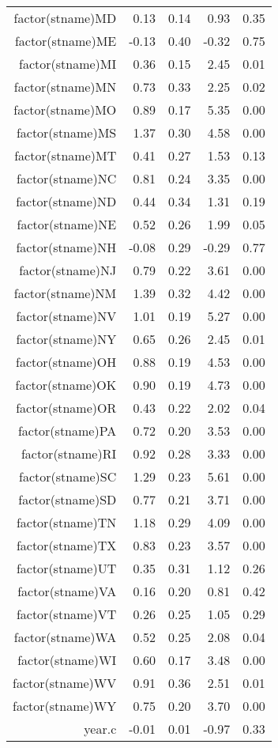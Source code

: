 \begin{table}[ht]
\begin{tabular}{rrrrr}
  factor(stname)MD & 0.13 & 0.14 & 0.93 & 0.35 \\ 
  factor(stname)ME & -0.13 & 0.40 & -0.32 & 0.75 \\ 
  factor(stname)MI & 0.36 & 0.15 & 2.45 & 0.01 \\ 
  factor(stname)MN & 0.73 & 0.33 & 2.25 & 0.02 \\ 
  factor(stname)MO & 0.89 & 0.17 & 5.35 & 0.00 \\ 
  factor(stname)MS & 1.37 & 0.30 & 4.58 & 0.00 \\ 
  factor(stname)MT & 0.41 & 0.27 & 1.53 & 0.13 \\ 
  factor(stname)NC & 0.81 & 0.24 & 3.35 & 0.00 \\ 
  factor(stname)ND & 0.44 & 0.34 & 1.31 & 0.19 \\ 
  factor(stname)NE & 0.52 & 0.26 & 1.99 & 0.05 \\ 
  factor(stname)NH & -0.08 & 0.29 & -0.29 & 0.77 \\ 
  factor(stname)NJ & 0.79 & 0.22 & 3.61 & 0.00 \\ 
  factor(stname)NM & 1.39 & 0.32 & 4.42 & 0.00 \\ 
  factor(stname)NV & 1.01 & 0.19 & 5.27 & 0.00 \\ 
  factor(stname)NY & 0.65 & 0.26 & 2.45 & 0.01 \\ 
  factor(stname)OH & 0.88 & 0.19 & 4.53 & 0.00 \\ 
  factor(stname)OK & 0.90 & 0.19 & 4.73 & 0.00 \\ 
  factor(stname)OR & 0.43 & 0.22 & 2.02 & 0.04 \\ 
  factor(stname)PA & 0.72 & 0.20 & 3.53 & 0.00 \\ 
  factor(stname)RI & 0.92 & 0.28 & 3.33 & 0.00 \\ 
  factor(stname)SC & 1.29 & 0.23 & 5.61 & 0.00 \\ 
  factor(stname)SD & 0.77 & 0.21 & 3.71 & 0.00 \\ 
  factor(stname)TN & 1.18 & 0.29 & 4.09 & 0.00 \\ 
  factor(stname)TX & 0.83 & 0.23 & 3.57 & 0.00 \\ 
  factor(stname)UT & 0.35 & 0.31 & 1.12 & 0.26 \\ 
  factor(stname)VA & 0.16 & 0.20 & 0.81 & 0.42 \\ 
  factor(stname)VT & 0.26 & 0.25 & 1.05 & 0.29 \\ 
  factor(stname)WA & 0.52 & 0.25 & 2.08 & 0.04 \\ 
  factor(stname)WI & 0.60 & 0.17 & 3.48 & 0.00 \\ 
  factor(stname)WV & 0.91 & 0.36 & 2.51 & 0.01 \\ 
  factor(stname)WY & 0.75 & 0.20 & 3.70 & 0.00 \\ 
  year.c & -0.01 & 0.01 & -0.97 & 0.33 \\ 
   \hline
\end{tabular}
\end{table}
